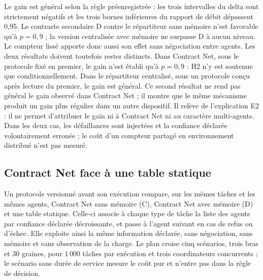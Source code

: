 Le gain est général selon la règle préenregistrée : les trois intervalles du delta sont strictement négatifs et les trois bornes inférieures du rapport de débit dépassent 0,95. Le contraste secondaire D contre le répartiteur sans mémoire n'est favorable qu'à $p=0{,}9$ ; la version centralisée avec mémoire ne surpasse D à aucun niveau. Le compteur lissé apporte donc aussi son effet sans négociation entre agents. Les deux résultats doivent toutefois rester distincts. Dans Contract Net, sous le protocole fixé en premier, le gain n'est établi qu'à $p=0{,}9$ : H2 n'y est soutenue que conditionnellement. Dans le répartiteur centralisé, sous un protocole conçu après lecture du premier, le gain est général. Ce second résultat ne rend pas général le gain observé dans Contract Net ; il montre que le même mécanisme produit un gain plus régulier dans un autre dispositif. Il relève de l'explication E2 : il ne permet d'attribuer le gain ni à Contract Net ni au caractère multi-agents. Dans les deux cas, les défaillances sont injectées et la confiance déclarée volontairement erronée ; le coût d'un compteur partagé en environnement distribué n'est pas mesuré.

\subsection{Contract Net face à une table statique}
\label{sec:e-cnp}

Un protocole versionné avant son exécution compare, sur les mêmes tâches et les mêmes agents, Contract Net sans mémoire (C), Contract Net avec mémoire (D) et une table statique. Celle-ci associe à chaque type de tâche la liste des agents par confiance déclarée décroissante, et passe à l'agent suivant en cas de refus ou d'échec. Elle exploite ainsi la même information déclarée, sans négociation, sans mémoire et sans observation de la charge. Le plan croise cinq scénarios, trois bras et 30 graines, pour $1\,000$ tâches par exécution et trois coordinateurs concurrents ; le scénario sans durée de service mesure le coût pur et n'entre pas dans la règle de décision.

